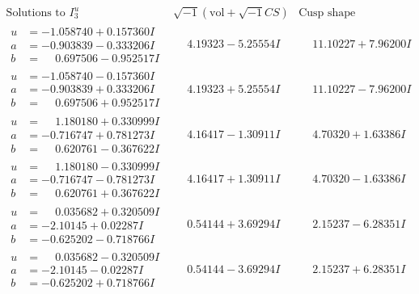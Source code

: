 \documentclass[1p]{elsarticle_modified}
\theoremstyle{definition}
\newcommand{\I}{\sqrt{-1}}
\begin{document}
$$\begin{array}{c|c|c}  
\text{Solutions to }I^u_{3}& \I (\text{vol} + \sqrt{-1}CS) & \text{Cusp shape}\\
 \hline 
\begin{aligned}
u &= -1.058740 + 0.157360 I \\
a &= -0.903839 - 0.333206 I \\
b &= \phantom{-}0.697506 - 0.952517 I\end{aligned}
 & \phantom{-}4.19323 - 5.25554 I & \phantom{-}11.10227 + 7.96200 I \\ \hline\begin{aligned}
u &= -1.058740 - 0.157360 I \\
a &= -0.903839 + 0.333206 I \\
b &= \phantom{-}0.697506 + 0.952517 I\end{aligned}
 & \phantom{-}4.19323 + 5.25554 I & \phantom{-}11.10227 - 7.96200 I \\ \hline\begin{aligned}
u &= \phantom{-}1.180180 + 0.330999 I \\
a &= -0.716747 + 0.781273 I \\
b &= \phantom{-}0.620761 - 0.367622 I\end{aligned}
 & \phantom{-}4.16417 - 1.30911 I & \phantom{-}4.70320 + 1.63386 I \\ \hline\begin{aligned}
u &= \phantom{-}1.180180 - 0.330999 I \\
a &= -0.716747 - 0.781273 I \\
b &= \phantom{-}0.620761 + 0.367622 I\end{aligned}
 & \phantom{-}4.16417 + 1.30911 I & \phantom{-}4.70320 - 1.63386 I \\ \hline\begin{aligned}
u &= \phantom{-}0.035682 + 0.320509 I \\
a &= -2.10145 + 0.02287 I \\
b &= -0.625202 - 0.718766 I\end{aligned}
 & \phantom{-}0.54144 + 3.69294 I & \phantom{-}2.15237 - 6.28351 I \\ \hline\begin{aligned}
u &= \phantom{-}0.035682 - 0.320509 I \\
a &= -2.10145 - 0.02287 I \\
b &= -0.625202 + 0.718766 I\end{aligned}
 & \phantom{-}0.54144 - 3.69294 I & \phantom{-}2.15237 + 6.28351 I \\ \hline\begin{aligned}

\end{aligned}
\end{array}$$
\end{document}

